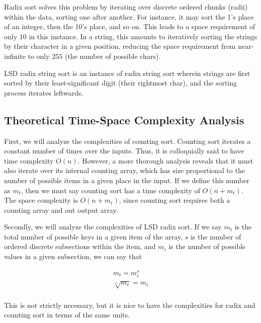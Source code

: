 \documentclass[12pt]{amsart}
\begin{document}
    Radix sort solves this problem by iterating over discrete
    ordered chunks (radii) within the data, sorting one after
    another. For instance, it may sort the 1's place of an
    integer, then the 10's place, and so on. This leads to a
    space requirement of only $10$ in this instance. In a
    string, this amounts to iteratively sorting the strings by
    their character in a given position, reducing the space
    requirement from near-infinite to only $255$ (the number of
    possible chars).

    LSD radix string sort is an instance of radix string sort
    wherein strings are first sorted by their least-significant
    digit (their rightmost char), and the sorting process
    iterates leftwards.

    \subsection{Theoretical Time-Space Complexity Analysis}

    First, we will analyze the complexities of counting sort.
    Counting sort iterates a constant number of times over the
    inputs. Thus, it is colloquially said to have time
    complexity $O(n)$. However, a more thorough analysis reveals
    that it must also iterate over its internal counting array,
    which has size proportional to the number of possible items
    in a given place in the input. If we define this number as
    $m_t$, then we must say counting sort has a time complexity of
    $O(n + m_t)$. The space complexity is $O(n + m_t)$, since
    counting sort requires both a counting array and out output
    array.

    Secondly, we will analyze the complexities of LSD radix
    sort. If we say $m_t$ is the total number of possible keys
    in a given item of the array, $s$ is the number of ordered
    discrete subsections within the item, and $m_i$ is the
    number of possible values in a given subsection, we can say
    that

    \[
    \begin{aligned}
        m_t = m_i^s            \\
        \sqrt[s]{m_t} = m_i    \\
    \end{aligned}
    \]

    This is not strictly necessary, but it is nice to have the
    complexities for radix and counting sort in terms of the
    same units.
\end{document}
